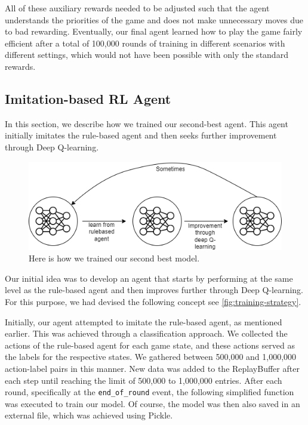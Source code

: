 All of these auxiliary rewards needed to be adjusted such that the agent understands the priorities of the game and does not make unnecessary moves due to bad rewarding. Eventually, our final agent learned how to play the game fairly efficient after a total of 100,000 rounds of training in different scenarios with different settings, which would not have been possible with only the standard rewards.

\newpage
{}
\subsection{Imitation-based RL Agent}

In this section, we describe how we trained our second-best agent. This agent initially imitates 
the rule-based agent and then seeks further improvement through Deep Q-learning.

\begin{figure}[H]
    \centering
    
    \includegraphics[width=\oneImgWidth]{images/training-strategy}%
    
    \captionadjust%
    \caption{\label{fig:training-strategy} Here is how we trained our second best model.
    }%
\end{figure}

Our initial idea was to develop an agent that starts by performing at the same level as the rule-based agent and then improves 
further through Deep Q-learning. For this purpose, we had devised the following concept see \autoref{fig:training-strategy}.

Initially, our agent attempted to imitate the rule-based agent, as mentioned earlier. This was achieved through a classification approach. 
We collected the actions of the rule-based agent for each game state, and these actions served as the labels for the respective states. 
We gathered between 500,000 and 1,000,000 action-label pairs in this manner.
New data was added to the ReplayBuffer after each step until reaching the limit of 500,000 to 1,000,000 entries. 
After each round, specifically at the \verb|end_of_round| event, the following simplified function was executed to train our model.
Of course, the model was then also saved in an external file, which was achieved using Pickle.

